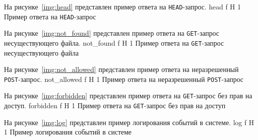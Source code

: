 \clearpage
На рисунке~\ref{img:head} представлен пример ответа на \texttt{HEAD}-запрос.
	{head}
	{f}
	{H}
	{1\textwidth}
	{Пример ответа на \texttt{HEAD}-запрос}

На рисунке~\ref{img:not_found} представлен пример ответа на \texttt{GET}-запрос несуществующего файла.
	{not_found}
	{f}
	{H}
	{1\textwidth}
	{Пример ответа на \texttt{GET}-запрос несуществующего файла}

На рисунке~\ref{img:not_allowed} представлен пример ответа на неразрешенный \texttt{POST}-запрос.
	{not_allowed}
	{f}
	{H}
	{1\textwidth}
	{Пример ответа на неразрешенный \texttt{POST}-запрос}

\clearpage
На рисунке~\ref{img:forbidden} представлен пример ответа на \texttt{GET}-запрос без прав на доступ.
	{forbidden}
	{f}
	{H}
	{1\textwidth}
	{Пример ответа на \texttt{GET}-запрос без прав на доступ}

На рисунке~\ref{img:log} представлен пример логирования событий в системе.
	{log}
	{f}
	{H}
	{1\textwidth}
	{Пример логирования событий в системе}